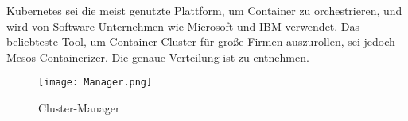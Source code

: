 \newpage
Kubernetes sei die meist genutzte Plattform, um Container zu orchestrieren, und wird von Software-Unternehmen wie Microsoft und IBM verwendet. Das beliebteste Tool, um Container-Cluster für große Firmen auszurollen, sei jedoch Mesos Containerizer. \cite{stats} Die genaue Verteilung ist  zu entnehmen.
\begin{figure}[H]
	\begin{center}
		\texttt{[image: Manager.png]}
	\end{center}
	\caption[Cluster-Manager]{Cluster-Manager \footnotemark}
	\label{fig:Stats4}
\end{figure}

